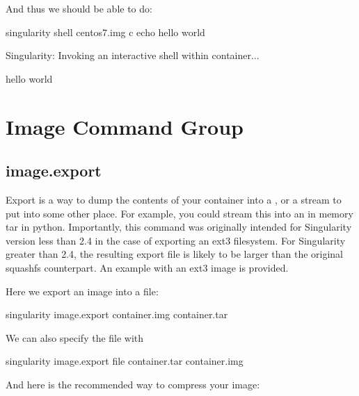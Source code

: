 \documentclass[letterpaper,10pt,english]{sphinxmanual}
\begin{document}
And thus we should be able to do:

%
\begin{sphinxVerbatim}[commandchars=\\\{\}]
\PYGZdl{} singularity shell centos7.img \PYGZhy{}c \PYGZdq{}echo hello world\PYGZdq{}

Singularity: Invoking an interactive shell within container...


hello world
\end{sphinxVerbatim}


\section{Image Command Group}
\label{\detokenize{appendix:image-command-group}}

\subsection{image.export}
\label{\detokenize{appendix:image-export}}\label{\detokenize{appendix:id38}}\label{\detokenize{appendix:sec-imageexport}}
Export is a way to dump the contents of your container into a , or a
stream to put into some other place. For example, you could stream
this into an in memory tar in python. Importantly, this command was
originally intended for Singularity version less than 2.4 in the case
of exporting an ext3 filesystem. For Singularity greater than 2.4, the
resulting export file is likely to be larger than the original
squashfs counterpart. An example with an ext3 image is provided.

Here we export an image into a  file:

%
\begin{sphinxVerbatim}[commandchars=\\\{\}]
singularity image.export container.img \PYGZgt{} container.tar
\end{sphinxVerbatim}

We can also specify the file with 

%
\begin{sphinxVerbatim}[commandchars=\\\{\}]
singularity image.export \PYGZhy{}\PYGZhy{}file container.tar container.img
\end{sphinxVerbatim}

And here is the recommended way to compress your image:
\end{document}
